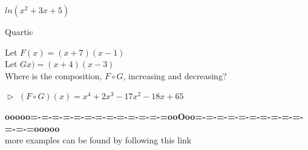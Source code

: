 \documentclass{ximera}
\begin{document}
\begin{example}   $ln(x^2 + 3x + 5)$




\end{example}



















\begin{example}   Quartic



Let $F(x) = (x+7)(x-1)$ \\


Let $Gx) = (x+4)(x-3)$ \\



Where is the composition, $F \circ G$, increasing and decreasing?


$\vartriangleright$  $(F \circ G)(x) = x^4 +2 x^3 -17 x^2 - 18 x + 65$




\end{example}












\begin{center}
\textbf{\textcolor{green!50!black}{ooooo=-=-=-=-=-=-=-=-=-=-=-=-=ooOoo=-=-=-=-=-=-=-=-=-=-=-=-=ooooo}} \\

more examples can be found by following this link\\ 

\end{center}
\end{document}
